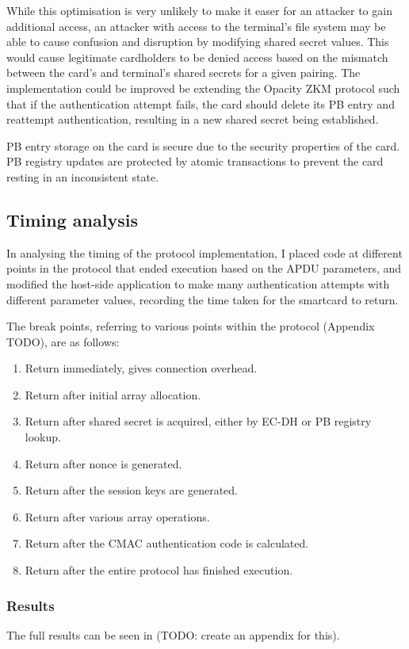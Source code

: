 \documentclass[12pt]{article}
\begin{document}
While this optimisation is very unlikely to make it easer for an attacker to gain additional access, an attacker with access to the terminal's file system may be able to cause confusion and disruption by modifying shared secret values. This would cause legitimate cardholders to be denied access based on the mismatch between the card's and terminal's shared secrets for a given pairing. The implementation could be improved be extending the Opacity ZKM protocol such that if the authentication attempt fails, the card should delete its PB entry and reattempt authentication, resulting in a new shared secret being established.

PB entry storage on the card is secure due to the security properties of the card. PB registry updates are protected by atomic transactions to prevent the card resting in an inconsistent state.


\subsection{Timing analysis}
In analysing the timing of the protocol implementation, I placed code at different points in the protocol that ended execution based on the APDU parameters, and modified the host-side application to make many authentication attempts with different parameter values, recording the time taken for the smartcard to return. 

The break points, referring to various points within the protocol (Appendix TODO), are as follows:
\begin{enumerate}
	\item Return immediately, gives connection overhead.
	\item Return after initial array allocation.
	\item Return after shared secret is acquired, either by EC-DH or PB registry lookup.
	\item Return after nonce is generated.
	\item Return after the session keys are generated.
	\item Return after various array operations.
	\item Return after the CMAC authentication code is calculated.
	\item Return after the entire protocol has finished execution.
\end{enumerate}

\subsubsection{Results}
The full results can be seen in (TODO: create an appendix for this).
\end{document}
